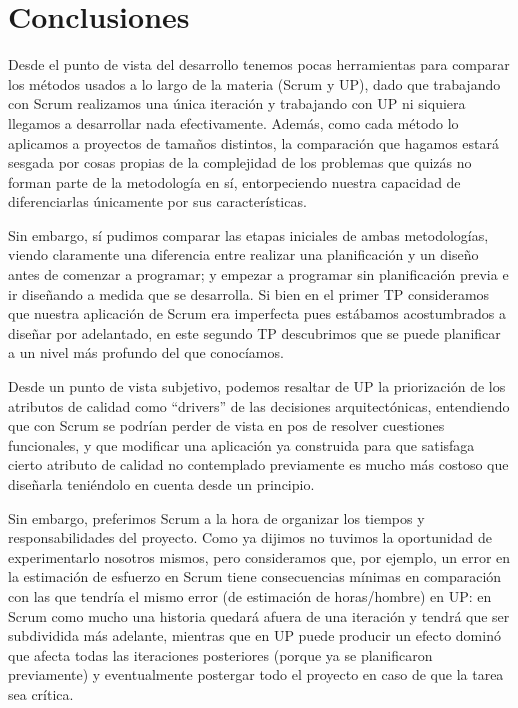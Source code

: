 \documentclass[a4paper, 10pt, twoside]{article}
\begin{document}
\newpage




\section{Conclusiones}

Desde el punto de vista del desarrollo tenemos pocas herramientas para comparar los métodos usados a lo largo de la materia (Scrum y UP),
dado que trabajando con Scrum realizamos una única iteración y trabajando con UP ni siquiera llegamos a desarrollar nada efectivamente.
Además, como cada método lo aplicamos a proyectos de tamaños distintos, la comparación que hagamos estará sesgada por cosas propias de la
complejidad de los problemas que quizás no forman parte de la metodología en sí, entorpeciendo nuestra capacidad de diferenciarlas únicamente
por sus características.

Sin embargo, sí pudimos comparar las etapas iniciales de ambas metodologías, viendo claramente una diferencia entre realizar una planificación
y un diseño antes de comenzar a programar; y empezar a programar sin planificación previa e ir diseñando a medida que se desarrolla. Si bien
en el primer TP consideramos que nuestra aplicación de Scrum era imperfecta pues estábamos acostumbrados a diseñar por adelantado,
en este segundo TP descubrimos que se puede planificar a un nivel más profundo del que conocíamos.

Desde un punto de vista subjetivo, podemos resaltar de UP la priorización de los atributos de calidad como ``drivers'' de las decisiones arquitectónicas,
entendiendo que con Scrum se podrían perder de vista en pos de resolver cuestiones funcionales, y que modificar una aplicación ya construida para que
satisfaga cierto atributo de calidad no contemplado previamente es mucho más costoso que diseñarla teniéndolo en cuenta desde un principio.

Sin embargo, preferimos Scrum a la hora de organizar los tiempos y responsabilidades del proyecto. Como ya dijimos no tuvimos la oportunidad de
experimentarlo nosotros mismos, pero consideramos que, por ejemplo, un error en la estimación de esfuerzo en Scrum tiene consecuencias mínimas
en comparación con las que tendría el mismo error (de estimación de horas/hombre) en UP: en Scrum como mucho una historia quedará afuera de una iteración y
tendrá que ser subdividida más adelante, mientras que en UP puede producir un efecto dominó que afecta todas las iteraciones posteriores
(porque ya se planificaron previamente) y eventualmente postergar todo el proyecto en caso de que la tarea sea crítica.
\end{document}
